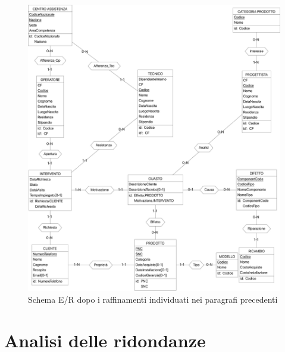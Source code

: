 \documentclass[a4paper, 12pt]{report}
\begin{document}
\begin{figure}[H]
	\centering
	\includegraphics[width=\linewidth]{images/Refined.png}
	\caption{Schema E/R dopo i raffinamenti individuati nei paragrafi precedenti}
\end{figure}

\section{Analisi delle ridondanze}
\end{document}
